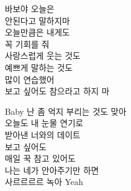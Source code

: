 \documentclass{oblivoir}
\begin{document}
\begin{center}
\noindent 바보야 오늘은\\
안된다고 말하지마\\
오늘만큼은 내게도\\
꼭 기회를 줘\\
사랑스럽게 웃는 것도\\
예쁘게 말하는 것도\\
많이 연습했어\\
보고 싶어도 참으라고 하지 마\\
\vspace{10pt}

\noindent Baby 난 좀 억지 부리는 것도 맞아\\
오늘도 내 눈물 연기로\\
받아낸 너와의 데이트\\
보고 싶어도\\
매일 꾹 참고 있어도\\
나는 네가 안아주기만 하면\\
사르르르르 녹아 Yeah
\end{center}
\end{document}
